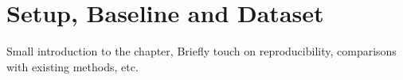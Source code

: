 \chapter{Setup, Baseline and Dataset}
\label{chapter: setup baseline dataset}

Small introduction to the chapter,
Briefly touch on reproducibility, comparisons with existing methods, etc.





